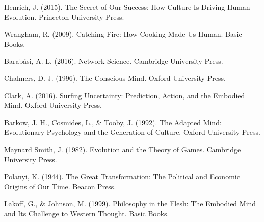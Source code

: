 \documentclass[12pt,a4paper]{article}
\begin{document}
\begin{thebibliography}{99}
Henrich, J. (2015). The Secret of Our Success: How Culture Is Driving Human Evolution. Princeton University Press.

Wrangham, R. (2009). Catching Fire: How Cooking Made Us Human. Basic Books.

Barabási, A. L. (2016). Network Science. Cambridge University Press.

Chalmers, D. J. (1996). The Conscious Mind. Oxford University Press.

Clark, A. (2016). Surfing Uncertainty: Prediction, Action, and the Embodied Mind. Oxford University Press.

Barkow, J. H., Cosmides, L., \& Tooby, J. (1992). The Adapted Mind: Evolutionary Psychology and the Generation of Culture. Oxford University Press.

Maynard Smith, J. (1982). Evolution and the Theory of Games. Cambridge University Press.

Polanyi, K. (1944). The Great Transformation: The Political and Economic Origins of Our Time. Beacon Press.

Lakoff, G., \& Johnson, M. (1999). Philosophy in the Flesh: The Embodied Mind and Its Challenge to Western Thought. Basic Books.

\end{thebibliography}
\end{document}
